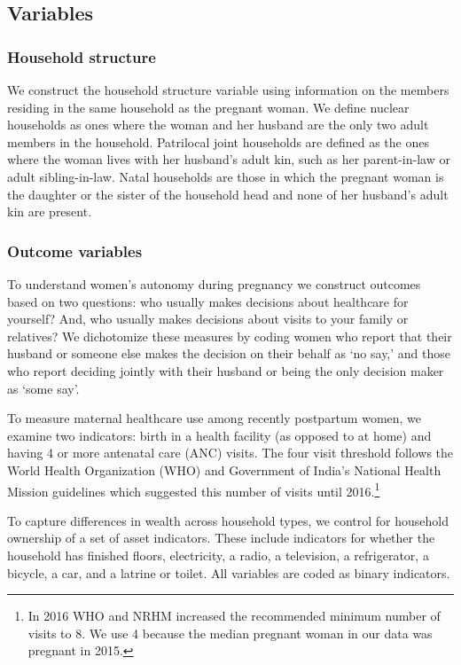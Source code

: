 \documentclass[12pt]{article}
\begin{document}
\subsection{Variables}

\subsubsection{Household structure}
We construct the household structure variable using information on the members residing in the same household as the pregnant woman. We define nuclear households as ones where the woman and her husband are the only two adult members in the household. Patrilocal joint households are defined as the ones where the woman lives with her husband’s adult kin, such as her parent-in-law or adult sibling-in-law. Natal households are those in which the pregnant woman is the daughter or the sister of the household head and none of her husband’s adult kin are present. 

\subsubsection{Outcome variables} \label{sec:outcomes}
To understand women's autonomy during pregnancy we construct outcomes based on two questions: who usually makes decisions about healthcare for yourself?  And, who usually makes decisions about visits to your family or relatives? We dichotomize these measures by coding women who report that their husband or someone else makes the decision on their behalf as ‘no say,’ and those who report deciding jointly with their husband or being the only decision maker as ‘some say’. 

To measure maternal healthcare use among recently postpartum women, we examine two indicators: birth in a health facility (as opposed to at home) and having 4 or more antenatal care (ANC) visits. The four visit threshold follows the World Health Organization (WHO) and Government of India’s National Health Mission guidelines which suggested this number of visits until 2016.\footnote{In 2016 WHO and NRHM increased the recommended minimum number of visits to 8.  We use 4 because the median pregnant woman in our data was pregnant in 2015.}

To capture differences in wealth across household types, we control for household ownership of a set of asset indicators. These include indicators for whether the household has finished floors, electricity, a radio, a television, a refrigerator, a bicycle, a car, and a latrine or toilet. All variables are coded as binary indicators.
\end{document}
